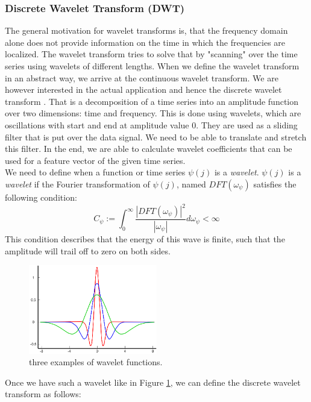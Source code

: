 \subsubsection{Discrete Wavelet Transform (DWT)}
The general motivation for wavelet transforms is, that the frequency domain alone does not provide information on the time in which the frequencies are localized. The wavelet transform tries to solve that by "scanning" over the time series using wavelets of different lengths. When we define the wavelet transform in an abstract way, we arrive at the continuous wavelet transform. We are however interested in the actual application and hence the discrete wavelet transform \cite{DBLP:journals/iet-spr/SangeethaH17}. That is a decomposition of a time series into an amplitude function over two dimensions: time and frequency. This is done using wavelets, which are oscillations with start and end at amplitude value 0. They are used as a sliding filter that is put over the data signal. We need to be able to translate and stretch this filter. In the end, we are able to calculate wavelet coefficients that can be used for a feature vector of the given time series.\\
We need to define when a function or time series $\psi(j)$ is a \textit{wavelet}. $\psi(j)$ is a \textit{wavelet} if the Fourier transformation of $\psi(j)$, named $DFT(\omega_\psi)$ satisfies the following condition:
\begin{equation}
	C_\psi := \int_{0}^{\infty}\frac{|DFT(\omega_\psi)|^2}{|\omega_\psi|} d \omega_\psi < \infty
\end{equation}
This condition describes that the energy of this wave is finite, such that the amplitude will trail off to zero on both sides. 
\begin{figure}[ht]
	\centering
	\includegraphics[width=0.5\textwidth]{gfx/DWT_wavelet2.PNG}
	\caption{three examples of wavelet functions.}
	\label{fig:DWT_wavelet}
\end{figure}
Once we have such a wavelet like in Figure \ref{fig:DWT_wavelet}, we can define the discrete wavelet transform as follows:
